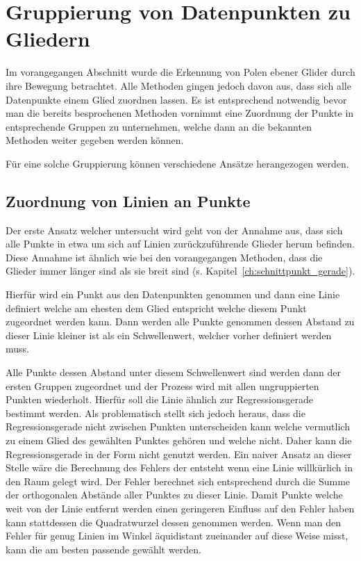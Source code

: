 
\chapter{Gruppierung von Datenpunkten zu Gliedern}


Im vorangegangen Abschnitt wurde die Erkennung von Polen ebener Glider durch ihre Bewegung betrachtet.
Alle Methoden gingen jedoch davon aus, dass sich alle Datenpunkte einem Glied zuordnen lassen.
Es ist entsprechend notwendig bevor man die bereits besprochenen Methoden vornimmt eine Zuordnung der Punkte in entsprechende Gruppen zu unternehmen, welche dann an die bekannten Methoden weiter gegeben werden können.

Für eine solche Gruppierung können verschiedene Ansätze herangezogen werden.

\section{Zuordnung von Linien an Punkte}

Der erste Ansatz welcher untersucht wird geht von der Annahme aus, dass sich alle Punkte in etwa um sich auf Linien zurückzuführende Glieder herum befinden.
Diese Annahme ist ähnlich wie bei den vorangegangen Methoden, dass die Glieder immer länger sind als sie breit sind (s. Kapitel~\ref{ch:schnittpunkt_gerade}).

Hierfür wird ein Punkt aus den Datenpunkten genommen und dann eine Linie definiert welche am ehesten dem Glied entspricht welche diesem Punkt zugeordnet werden kann.
Dann werden alle Punkte genommen dessen Abstand zu dieser Linie kleiner ist als ein Schwellenwert, welcher vorher definiert werden muss.

Alle Punkte dessen Abstand unter diesem Schwellenwert sind werden dann der ersten Gruppen zugeordnet und der Prozess wird mit allen ungruppierten Punkten wiederholt.
Hierfür soll die Linie ähnlich zur Regressionsgerade bestimmt werden.
Als problematisch stellt sich jedoch heraus, dass die Regressionsgerade nicht zwischen Punkten unterscheiden kann welche vermutlich zu einem Glied des gewählten Punktes gehören und welche nicht.
Daher kann die Regressionsgerade in der Form nicht genutzt werden.
Ein naiver Ansatz an dieser Stelle wäre die Berechnung des Fehlers der entsteht wenn eine Linie willkürlich in den Raum gelegt wird.
Der Fehler berechnet sich entsprechend durch die Summe der orthogonalen Abstände aller Punktes zu dieser Linie.
Damit Punkte welche weit von der Linie entfernt werden einen geringeren Einfluss auf den Fehler haben kann stattdessen die Quadratwurzel dessen genommen werden.
Wenn man den Fehler für genug Linien im Winkel äquidistant zueinander auf diese Weise misst, kann die am besten passende gewählt werden.

